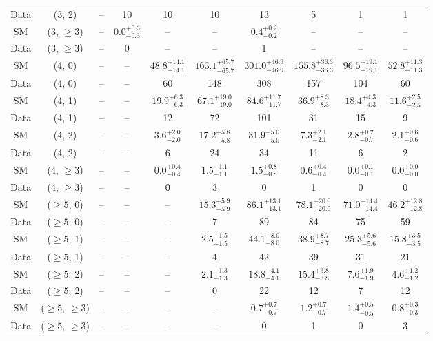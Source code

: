 \begin{table}[h!]
{\begin{tabular}{cccccccccc}
	Data & (3, 2) & -- & 10 & 10 & 10 & 13 & 5 & 1 & 1 \\[0.5ex] 
	SM & (3, $\ge3$) & -- & $0.0^{+ 0.3 }_{- 0.3 }$ & -- & -- & $0.4^{+ 0.2 }_{- 0.2 }$ & -- & -- & -- \\[0.5ex] 
	Data & (3, $\ge3$) & -- & 0 & -- & -- & 1 & -- & -- & -- \\[0.5ex] 
	SM & (4, 0) & -- & -- & $48.8^{+ 14.1 }_{- 14.1 }$ & $163.1^{+ 65.7 }_{- 65.7 }$ & $301.0^{+ 46.9 }_{- 46.9 }$ & $155.8^{+ 36.3 }_{- 36.3 }$ & $96.5^{+ 19.1 }_{- 19.1 }$ & $52.8^{+ 11.3 }_{- 11.3 }$ \\[0.5ex] 
	Data & (4, 0) & -- & -- & 60 & 148 & 308 & 157 & 104 & 60 \\[0.5ex] 
	SM & (4, 1) & -- & -- & $19.9^{+ 6.3 }_{- 6.3 }$ & $67.1^{+ 19.0 }_{- 19.0 }$ & $84.6^{+ 11.7 }_{- 11.7 }$ & $36.9^{+ 8.3 }_{- 8.3 }$ & $18.4^{+ 4.3 }_{- 4.3 }$ & $11.6^{+ 2.5 }_{- 2.5 }$ \\[0.5ex] 
	Data & (4, 1) & -- & -- & 12 & 72 & 101 & 31 & 15 & 9 \\[0.5ex] 
	SM & (4, 2) & -- & -- & $3.6^{+ 2.0 }_{- 2.0 }$ & $17.2^{+ 5.8 }_{- 5.8 }$ & $31.9^{+ 5.0 }_{- 5.0 }$ & $7.3^{+ 2.1 }_{- 2.1 }$ & $2.8^{+ 0.7 }_{- 0.7 }$ & $2.1^{+ 0.6 }_{- 0.6 }$ \\[0.5ex] 
	Data & (4, 2) & -- & -- & 6 & 24 & 34 & 11 & 6 & 2 \\[0.5ex] 
	SM & (4, $\ge3$) & -- & -- & $0.0^{+ 0.4 }_{- 0.4 }$ & $1.5^{+ 1.1 }_{- 1.1 }$ & $1.5^{+ 0.8 }_{- 0.8 }$ & $0.6^{+ 0.4 }_{- 0.4 }$ & $0.0^{+ 0.1 }_{- 0.1 }$ & $0.0^{+ 0.0 }_{- 0.0 }$ \\[0.5ex] 
	Data & (4, $\ge3$) & -- & -- & 0 & 3 & 0 & 1 & 0 & 0 \\[0.5ex] 
	SM & ($\ge5$, 0) & -- & -- & -- & $15.3^{+ 5.9 }_{- 5.9 }$ & $86.1^{+ 13.1 }_{- 13.1 }$ & $78.1^{+ 20.0 }_{- 20.0 }$ & $71.0^{+ 14.4 }_{- 14.4 }$ & $46.2^{+ 12.8 }_{- 12.8 }$ \\[0.5ex] 
	Data & ($\ge5$, 0) & -- & -- & -- & 7 & 89 & 84 & 75 & 59 \\[0.5ex] 
	SM & ($\ge5$, 1) & -- & -- & -- & $2.5^{+ 1.5 }_{- 1.5 }$ & $44.1^{+ 8.0 }_{- 8.0 }$ & $38.9^{+ 8.7 }_{- 8.7 }$ & $25.3^{+ 5.6 }_{- 5.6 }$ & $15.8^{+ 3.5 }_{- 3.5 }$ \\[0.5ex] 
	Data & ($\ge5$, 1) & -- & -- & -- & 4 & 42 & 39 & 31 & 21 \\[0.5ex] 
	SM & ($\ge5$, 2) & -- & -- & -- & $2.1^{+ 1.3 }_{- 1.3 }$ & $18.8^{+ 4.1 }_{- 4.1 }$ & $15.4^{+ 3.8 }_{- 3.8 }$ & $7.6^{+ 1.9 }_{- 1.9 }$ & $4.6^{+ 1.2 }_{- 1.2 }$ \\[0.5ex] 
	Data & ($\ge5$, 2) & -- & -- & -- & 0 & 22 & 12 & 7 & 12 \\[0.5ex] 
	SM & ($\ge5$, $\ge3$) & -- & -- & -- & -- & $0.7^{+ 0.7 }_{- 0.7 }$ & $1.2^{+ 0.7 }_{- 0.7 }$ & $1.4^{+ 0.5 }_{- 0.5 }$ & $0.8^{+ 0.3 }_{- 0.3 }$ \\[0.5ex] 
	Data & ($\ge5$, $\ge3$) & -- & -- & -- & -- & 0 & 1 & 0 & 3 \\[0.5ex] 
	\hline
	\hline
\end{tabular}}
\end{table}
